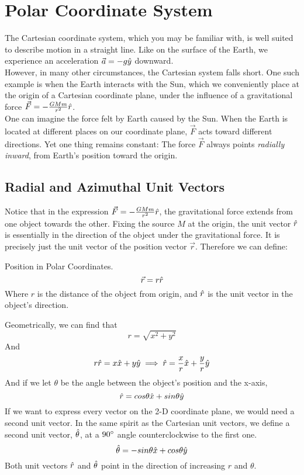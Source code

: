 \documentclass[11pt]{article}
\theoremstyle{gangnamstyle}{\newtheorem{definition}{Definition}[]}
\theoremstyle{gangnamstyle}{\newtheorem{example}{Example}[]}
\theoremstyle{gangnamstyle}{\newtheorem{problem}{Problem}[]}
\begin{document}
\section{Polar Coordinate System}

The Cartesian coordinate system, which you may be familiar with, is well suited to describe motion in a straight line. Like on the surface of the Earth, we experience an acceleration $\Vec{a} = -g\Hat{y}$ downward. \\ 
However, in many other circumstances, the Cartesian system falls short. One such example is when the Earth interacts with the Sun, which we conveniently place at the origin of a Cartesian coordinate plane, under the influence of a gravitational force $\Vec{F} = -\frac{GMm}{r^2} \Hat{r}$. \\
One can imagine the force felt by Earth caused by the Sun. When the Earth is located at different places on our coordinate plane, $\Vec{F}$ acts toward different directions. Yet one thing remains constant: The force $\Vec{F}$ always points \textit{radially inward}, from Earth's position toward the origin. 

\subsection{Radial and Azimuthal Unit Vectors}

Notice that in the expression $\Vec{F} = -\frac{GMm}{r^2} \Hat{r}$, the gravitational force extends from one object towards the other. Fixing the source $M$ at the origin, the unit vector $\Hat{r}$ is essentially in the direction of the object under the gravitational force. It is precisely just the unit vector of the position vector $\Vec{r}$. Therefore we can define: 

\begin{definition}
Position in Polar Coordinates. \\
\begin{equation}
\Vec{r} = r \Hat{r}
\end{equation}
Where $r$ is the distance of the object from origin, and $\Hat{r}$ is the unit vector in the object's direction. 
\end{definition}

Geometrically, we can find that 
\[ r = \sqrt{x^2 + y^2} \]
And
\[ r\Hat{r} = x\Hat{x} + y\Hat{y} \implies \Hat{r} = \frac{x}{r}\Hat{x} + \frac{y}{r}\Hat{y} \]
And if we let $\theta$ be the angle between the object's position and the x-axis, 
\[ \Hat{r} = cos\theta\Hat{x} + sin\theta\Hat{y} \]
If we want to express every vector on the 2-D coordinate plane, we would need a second unit vector. In the same spirit as the Cartesian unit vectors, we define a second unit vector, $\Hat{\theta}$, at a $90 \degree$ angle counterclockwise to the first one. 
\[ \Hat{\theta} = -sin\theta\Hat{x} + cos\theta\Hat{y} \]
Both unit vectors $\Hat{r}$ and $\Hat{\theta}$ point in the direction of increasing $r$ and $\theta$. 
\end{document}
